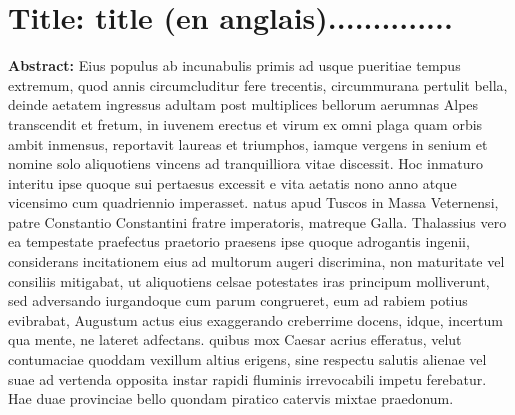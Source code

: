 \section*{\small\textcolor{mathSTIC-Color}{Title:} title (en anglais)..............}
\vspace{-0.2cm}
\vspace{-0.2cm}
\begin{multicols}{2}
\begin{small}
\begin{spacing}{1}
\noindent \textbf{Abstract: }Eius populus ab incunabulis primis ad usque pueritiae tempus extremum, quod annis circumcluditur fere trecentis, circummurana pertulit bella, deinde aetatem ingressus adultam post multiplices bellorum aerumnas Alpes transcendit et fretum, in iuvenem erectus et virum ex omni plaga quam orbis ambit inmensus, reportavit laureas et triumphos, iamque vergens in senium et nomine solo aliquotiens vincens ad tranquilliora vitae discessit.
Hoc inmaturo interitu ipse quoque sui pertaesus excessit e vita aetatis nono anno atque vicensimo cum quadriennio imperasset. natus apud Tuscos in Massa Veternensi, patre Constantio Constantini fratre imperatoris, matreque Galla.
Thalassius vero ea tempestate praefectus praetorio praesens ipse quoque adrogantis ingenii, considerans incitationem eius ad multorum augeri discrimina, non maturitate vel consiliis mitigabat, ut aliquotiens celsae potestates iras principum molliverunt, sed adversando iurgandoque cum parum congrueret, eum ad rabiem potius evibrabat, Augustum actus eius exaggerando creberrime
docens, idque, incertum qua mente, ne lateret adfectans. quibus mox Caesar acrius efferatus, velut contumaciae quoddam vexillum altius erigens, sine respectu salutis alienae vel suae ad vertenda opposita instar rapidi fluminis irrevocabili impetu ferebatur.
Hae duae provinciae bello quondam piratico catervis mixtae praedonum.
\end{spacing}
\end{small}
\end{multicols}

\restoregeometry
